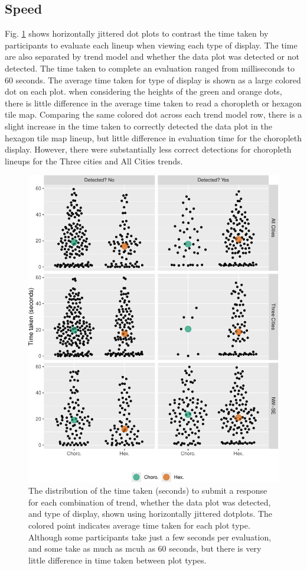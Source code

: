 \documentclass[
]{article}
\begin{document}
\subsection{Speed}\label{speed}

Fig. \ref{fig:beeswarm} shows horizontally jittered dot plots to
contrast the time taken by participants to evaluate each lineup when
viewing each type of display. The time are also separated by trend model
and whether the data plot was detected or not detected. The time taken
to complete an evaluation ranged from milliseconds to 60 seconds. The
average time taken for type of display is shown as a large colored dot
on each plot. when considering the heights of the green and orange dots,
there is little difference in the average time taken to read a
choropleth or hexagon tile map. Comparing the same colored dot across
each trend model row, there is a slight increase in the time taken to
correctly detected the data plot in the hexagon tile map lineup, but
little difference in evaluation time for the choropleth display.
However, there were substantially less correct detections for choropleth
lineups for the Three cities and All Cities trends.

\begin{figure}
\includegraphics[width=1\linewidth]{paper_files/figure-latex/beeswarm-1} \caption{The distribution of the time taken (seconds) to submit a response for each combination of trend, whether the data plot was detected, and type of display, shown using horizontally jittered dotplots. The colored point indicates average time taken for each plot type. Although some participants take just a few seconds per evaluation, and some take as much as mcuh as 60 seconds, but there is very little difference in time taken between plot types.}\label{fig:beeswarm}
\end{figure}
\end{document}
